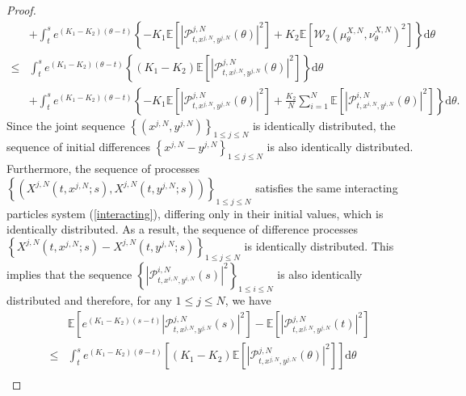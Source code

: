 \documentclass[10pt,a4paper]{amsart}
\begin{document}
\begin{proof}
\begin{equation}
\begin{aligned}
&+\int_t^s  e^{\left(K_1-K_2\right)\left(\theta-t\right)}\left\{-K_1\mathbb{E}\left[\left|\mathcal{P}^{j,N}_{t, x^{j,N}, y^{j,N}}\left(\theta\right)\right|^{2}\right]+K_2\mathbb{E}\left[\mathcal{W}_2\left(\mu _{\theta}^{X,N},\nu _{\theta}^{X,N}\right)^2\right]\right\}\mathrm{d} \theta\\
\leq & \int_t^s  e^{\left(K_1-K_2\right)\left(\theta-t\right)}\left\{\left(K_1-K_2\right)\mathbb{E}\left[\left|\mathcal{P}^{j,N}_{t, x^{j,N}, y^{j,N}}\left(\theta\right)\right|^{2}\right]\right\}\mathrm{d} \theta\\ 
&+\int_t^s  e^{\left(K_1-K_2\right)\left(\theta-t\right)}\left\{-K_1\mathbb{E}\left[\left|\mathcal{P}^{j,N}_{t, x^{j,N}, y^{j,N}}\left(\theta\right)\right|^{2}\right]+\tfrac{K_2}{N}\sum_{i=1}^N{\mathbb{E} \left[ \left|\mathcal{P}_{t,x^{i,N},y^{i,N}}^{i,N}\left( \theta \right) \right|^2\right]}\right\}\mathrm{d} \theta.
\end{aligned}
\end{equation}
Since the joint sequence $
\left\{ \left( x^{j,N},y^{j,N} \right) \right\} _{1\leq j\leq N}$ is   identically distributed,
the sequence of initial differences $
\left\{  x^{j,N}-y^{j,N}  \right\} _{1\leq j\leq N}$ is also identically distributed. Furthermore, the sequence of processes $\left\{ \left( X^{j,N}\left( t,x^{j,N};s \right) ,X^{j,N}\left( t,y^{j,N};s \right) \right) \right\} _{1\le j\le N}$ satisfies  the same interacting particles system (\ref{interacting}), differing only in their initial values, which is identically distributed. 
As a result, the sequence of difference processes 
 $\left\{ X^{j,N}\left( t,x^{j,N};s \right)-X^{j,N}\left( t,y^{j,N};s \right) \right\} _{1\leq j\leq N}$ is identically distributed. This implies that  the sequence $\left\{ \left|\mathcal{P} _{t,x^{i,N},y^{i,N}}^{i,N}\left( s\right) \right|^2 \right\} _{1 \leq i\leq N}$ is also identically distributed and therefore, for any $1\leq j\leq N$, we have  
\begin{equation}\tag{5.31}\label{4.14}
\begin{aligned}
&\mathbb{E}\left[e^{\left(K_1-K_2\right)\left(s-t\right)}\left|\mathcal{P}^{j,N}_{t, x^{j,N}, y^{j,N}}\left(s\right)\right|^{2}\right]-\mathbb{E}\left[\left|\mathcal{P}^{j,N}_{t, x^{j,N}, y^{j,N}}\left(t\right)\right|^{2}\right] \\
\leq & \int_t^s  e^{\left(K_1-K_2\right)\left(\theta-t\right)}\left[\left(K_1-K_2\right)\mathbb{E}\left[\left|\mathcal{P}^{j,N}_{t, x^{j,N}, y^{j,N}}\left(\theta\right)\right|^{2}\right]\right]\mathrm{d} \theta\\ 

\end{aligned}
\end{equation}
\end{proof}
\end{document}
